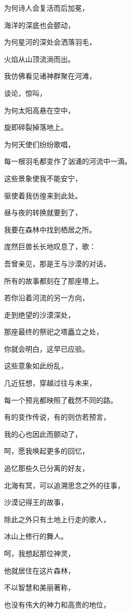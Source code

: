 \documentclass[UTF8]{article}
\begin{document}
\par 为何诗人会复活而后加冕，
\par 海洋的深底也会颤动，
\par 为何星河的深处会洒落羽毛，
\par 火焰从山顶流淌而出。
\par 我仿佛看见诸神群聚在河滩，
\par 谈论，惊叫，
\par 为何太阳高悬在空中，
\par 旋即碎裂掉落地上。
\par 为何天使们纷纷歌唱，
\par 每一根羽毛都变作了汹涌的河流中一滴。
\par 这些景象使我不能安宁，
\par 驱使着我彷徨来到此处。
\par 昼与夜的转换就要到了，
\par 我要在森林中找到栖居之所。
\\[0.6cm]
\par 庞然巨兽长长地叹息了，歌：
\\[0.6cm]
\par 吾曾亲见，那是王与沙漠的对话，
\par 所有的故事都刻在了那座塔上。
\par 若你沿着河流的另一方向，
\par 走到绝望的沙漠深处，
\par 那座最终的祭祀之塔矗立之处，
\par 你就会明白，这早已应验。
\par 这些意象如此纷乱，
\par 几近狂想，穿越过往与未来，
\par 每一个预兆都映照了截然不同的路。
\par 有的变作传说，有的则仿若预言，
\par 我的心也因此而颤动了，
\par 呵，愿我唤起更多的回忆，
\par 追忆那些久已分离的好友，
\par 北海有冥，可以追溯思念之外的往事，
\par 沙漠记得王的故事，
\par 除此之外只有土地上行走的歌人，
\par 冰山上修行的舞人。
\par 呵，我想起那位神灵，
\par 他就居住在这片森林，
\par 不以智慧和美丽著称，
\par 也没有伟大的神力和高贵的地位，
\end{document}
